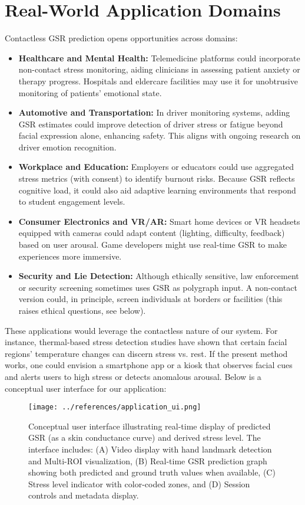 \documentclass[12pt]{article}
\begin{document}
    \section{Real-World Application Domains}
    Contactless GSR prediction opens opportunities across domains:
    \begin{itemize}
        \item \textbf{Healthcare and Mental Health:} Telemedicine platforms could incorporate non-contact stress monitoring, aiding clinicians in assessing patient anxiety or therapy progress. Hospitals and eldercare facilities may use it for unobtrusive monitoring of patients' emotional state.
        \item \textbf{Automotive and Transportation:} In driver monitoring systems, adding GSR estimates could improve detection of driver stress or fatigue beyond facial expression alone, enhancing safety. This aligns with ongoing research on driver emotion recognition.
        \item \textbf{Workplace and Education:} Employers or educators could use aggregated stress metrics (with consent) to identify burnout risks. Because GSR reflects cognitive load, it could also aid adaptive learning environments that respond to student engagement levels.
        \item \textbf{Consumer Electronics and VR/AR:} Smart home devices or VR headsets equipped with cameras could adapt content (lighting, difficulty, feedback) based on user arousal. Game developers might use real-time GSR to make experiences more immersive.
        \item \textbf{Security and Lie Detection:} Although ethically sensitive, law enforcement or security screening sometimes uses GSR as polygraph input. A non-contact version could, in principle, screen individuals at borders or facilities (this raises ethical questions, see below).
    \end{itemize}
    These applications would leverage the contactless nature of our system. For instance, thermal-based stress detection studies have shown that certain facial regions' temperature changes can discern stress vs. rest. If the present method works, one could envision a smartphone app or a kiosk that observes facial cues and alerts users to high stress or detects anomalous arousal. Below is a conceptual user interface for our application:
    \begin{figure}[ht]
        \centering
        \texttt{[image: ../references/application\_ui.png]}
        \caption{Conceptual user interface illustrating real-time display of predicted GSR (as a skin conductance curve) and derived stress level. The interface includes: (A) Video display with hand landmark detection and Multi-ROI visualization, (B) Real-time GSR prediction graph showing both predicted and ground truth values when available, (C) Stress level indicator with color-coded zones, and (D) Session controls and metadata display.}
        \label{fig:ui}
    \end{figure}
\end{document}
